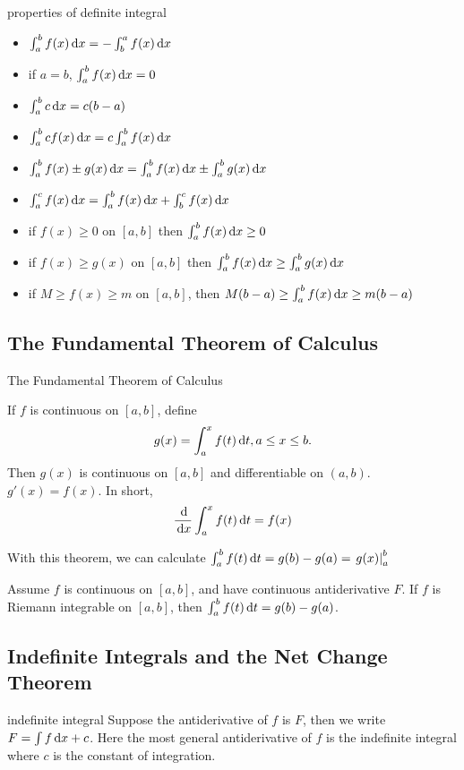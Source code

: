 \documentclass[Calculus 1 Recitation.tex]{subfiles}
\begin{document}
\begin{myleftlinebox}
	properties of definite integral
	\tcblower
	\begin{itemize}
		\item $\int_a^b f(x)\,\mathrm{d} x = -\int_b^a f(x) \,\mathrm{d} x$
		\item if $a=b$, $\int_a^b f(x)\,\mathrm{d} x =0$
		\item $\int_a^b c\,\mathrm{d} x =c(b-a)$
		\item $\int_a^b cf(x)\,\mathrm{d} x =c\int_a^b f(x)\,\mathrm{d} x $
		\item $\int_a^b f(x)\pm g(x)\,\mathrm{d} x = \int_a^b f(x)\,\mathrm{d} x \pm \int_a^b g(x)\,\mathrm{d} x$
		\item $\int_a^c f(x)\,\mathrm{d} x = \int_a^b f(x)\,\mathrm{d} x +\int_b^c f(x)\,\mathrm{d} x$
		\item if $f(x)\geq 0$ on $[a,b]$ then $\int_a^b f(x)\,\mathrm{d} x \geq 0$
		\item if $f(x)\geq g(x)$ on $[a,b]$ then $\int_a^b f(x)\,\mathrm{d} x \geq \int_a^b g(x)\,\mathrm{d} x$
		\item if $M\geq f(x)\geq m$ on $[a,b]$, then $M(b-a) \geq \int_a^b f(x)\,\mathrm{d} x \geq m(b-a)$
	\end{itemize}
\end{myleftlinebox}

\subsection{The Fundamental Theorem of Calculus}
\begin{myleftlinebox}
	The Fundamental Theorem of Calculus
	\tcblower
	\begin{theorem}
		If $f$ is continuous on $[a,b]$, define 
		\[g(x)=\int_{a}^x f(t)\,\mathrm{d} t, a\leq x\leq b.\]
		Then $g(x)$ is continuous on $[a,b]$ and differentiable on $(a,b)$. $g'(x)=f(x)$. In short,
		\[\frac{\,\mathrm{d}}{\,\mathrm{d} x}\int_a^x f(t)\,\mathrm{d} t=f(x)\]
	\end{theorem}
	With this theorem, we can calculate $\int_a^b f(t)\,\mathrm{d} t=g(b)-g(a)=\left.g(x)\right|_a^b$
	\begin{theorem}
		Assume $f$ is continuous on $[a,b]$, and have continuous antiderivative $F$. If $f$ is Riemann integrable on $[a,b]$, then $\int_a^b f(t)\,\mathrm{d} t=g(b)-g(a)$.
	\end{theorem}
\end{myleftlinebox}

\subsection{Indefinite Integrals and the Net Change Theorem}
\begin{myleftlinebox}
	indefinite integral
	\tcblower
	Suppose the antiderivative of $f$ is $F$, then we write $F = \int f \,\mathrm{d} x +c$. Here the most general antiderivative of $f$ is the indefinite integral where $c$ is the constant of integration.
\end{myleftlinebox}
\end{document}
